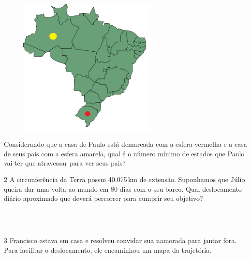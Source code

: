 {{\begin{figure}[H]
\centering\includegraphics[width=2.73952in,height=2.725in]{./imgSAEB_8_MAT/media/image36.png}
\end{figure}


Considerando que a casa de Paulo está demarcada com a esfera vermelha e
a casa de seus pais com a esfera amarela, qual é o número mínimo de
estados que Paulo vai ter que atravessar para ver seus pais?


\num{2} A circunferência da Terra possui 40.075\,km de extensão. Suponhamos
que Júlio queira dar uma volta ao mundo em 80 dias com o seu barco. Qual
deslocamento diário aproximado que deverá percorrer para cumprir seu
objetivo?

\\
\\

\pagebreak

\num{3} Francisco estava em casa e resolveu convidar sua namorada para jantar
fora. Para facilitar o deslocamento, ele encaminhou um mapa da
trajetória.



}}
